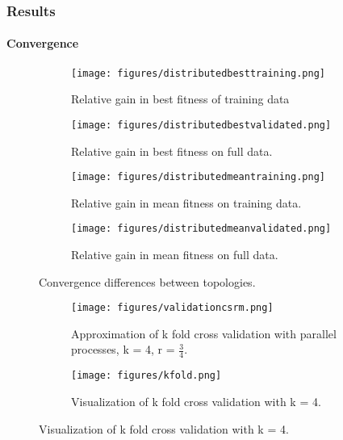\subsubsection{Results}
\paragraph{Convergence}
\begin{figure*}
    \centering
    \begin{subfigure}{0.5\textwidth}
    \centering
        \texttt{[image: figures/distributedbesttraining.png]}
        \caption{Relative gain in best fitness of training data}
    \end{subfigure}%
    \begin{subfigure}{0.5\textwidth}
    \centering
        \texttt{[image: figures/distributedbestvalidated.png]}
        \caption{Relative gain in best fitness on full data.}
    \end{subfigure}
        \begin{subfigure}{0.5\textwidth}
    \centering
        \texttt{[image: figures/distributedmeantraining.png]}
        \caption{Relative gain in mean fitness on training data.}
    \end{subfigure}%
    \begin{subfigure}{0.5\textwidth}
    \centering
        \texttt{[image: figures/distributedmeanvalidated.png]}
        \caption{Relative gain in mean fitness on full data.}
    \end{subfigure}
    \caption{Convergence differences between topologies.}
    \label{fig:distributedresults}
\end{figure*}
\begin{figure}
	\begin{subfigure}{0.5\textwidth}\label{fig:csrmkfold}
    \texttt{[image: figures/validationcsrm.png]}
    \caption{Approximation of k fold cross validation with parallel processes, k = 4,  r = $\frac{3}{4}$.}
    \end{subfigure}
	\begin{subfigure}{0.5\textwidth}    \label{fig:kfold}

    \centering
    \texttt{[image: figures/kfold.png]}
    \caption{Visualization of k fold cross validation with k = 4.}
    \end{subfigure}%
    \label{fig:ckfold}
 \end{figure}
